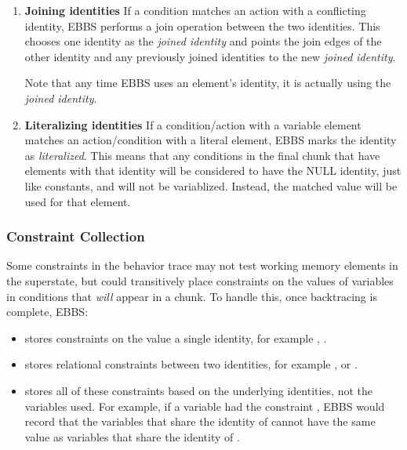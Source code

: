 \begin{enumerate}
	\item \textbf{Joining identities} \newline
	If a condition matches an action with a conflicting identity, EBBS performs a join operation between the two identities. This chooses one identity as the \textit{joined identity} and points the join edges of the other identity and any previously joined identities to the new \textit{joined identity}.

	Note that any time EBBS uses an element's identity, it is actually using the \textit{joined identity}.

	\item \textbf{Literalizing identities} \newline
	If a condition/action with a variable element matches an action/condition with a literal element, EBBS marks the identity as \textit{literalized}.  This means that any conditions in the final chunk that have elements with that identity will be considered to have the NULL identity, just like constants, and will not be variablized.  Instead, the matched value will be used for that element.
\end{enumerate}

\subsubsection{Constraint Collection}

Some constraints in the behavior trace may not test working memory elements in the superstate, but could transitively place constraints on the values of variables in conditions that \textit{will} appear in a chunk. To handle this, once backtracing is complete, EBBS:

\begin{itemize}
	\item stores constraints on the value a single identity, for example , .
	\item stores relational constraints between two identities, for example ,   or  .
	\item stores all of these constraints based on the underlying identities, not the variables used.  For example, if a variable  had the constraint , EBBS would record that the variables that share the identity of  cannot have the same value as variables that share the identity of .
\end{itemize}

